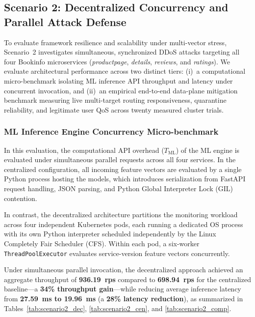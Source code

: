 
\subsection{Scenario 2: Decentralized Concurrency and Parallel Attack Defense}
\label{sec:scenario2}

To evaluate framework resilience and scalability under multi-vector stress, Scenario~2 investigates simultaneous, synchronized DDoS attacks targeting all four Bookinfo microservices (\textit{productpage}, \textit{details}, \textit{reviews}, and \textit{ratings}). We evaluate architectural performance across two distinct tiers: (i)~a computational micro-benchmark isolating ML inference API throughput and latency under concurrent invocation, and (ii)~an empirical end-to-end data-plane mitigation benchmark measuring live multi-target routing responsiveness, quarantine reliability, and legitimate user QoS across twenty measured cluster trials.

\subsubsection{ML Inference Engine Concurrency Micro-benchmark}
In this evaluation, the computational API overhead ($T_{\text{ML}}$) of the ML engine is evaluated under simultaneous parallel requests across all four services. In the centralized configuration, all incoming feature vectors are evaluated by a single Python process hosting the models, which introduces serialization from FastAPI request handling, JSON parsing, and Python Global Interpreter Lock (GIL) contention. 

In contrast, the decentralized architecture partitions the monitoring workload across four independent Kubernetes pods, each running a dedicated OS process with its own Python interpreter scheduled independently by the Linux Completely Fair Scheduler (CFS). Within each pod, a six-worker \texttt{ThreadPoolExecutor} evaluates service-version feature vectors concurrently. 

Under simultaneous parallel invocation, the decentralized approach achieved an aggregate throughput of \textbf{936.19~rps} compared to \textbf{698.94~rps} for the centralized baseline—a \textbf{34\% throughput gain}—while reducing average inference latency from \textbf{27.59~ms to 19.96~ms} (a \textbf{28\% latency reduction}), as summarized in Tables~\ref{tab:scenario2_dec}, \ref{tab:scenario2_cen}, and \ref{tab:scenario2_comp}.

